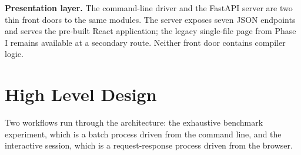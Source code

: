 \textbf{Presentation layer.} The command-line driver and the FastAPI server are two thin front doors to the same modules. The server exposes seven JSON endpoints and serves the pre-built React application; the legacy single-file page from Phase I remains available at a secondary route. Neither front door contains compiler logic.

\section{High Level Design}

Two workflows run through the architecture: the exhaustive benchmark experiment, which is a batch process driven from the command line, and the interactive session, which is a request-response process driven from the browser.

